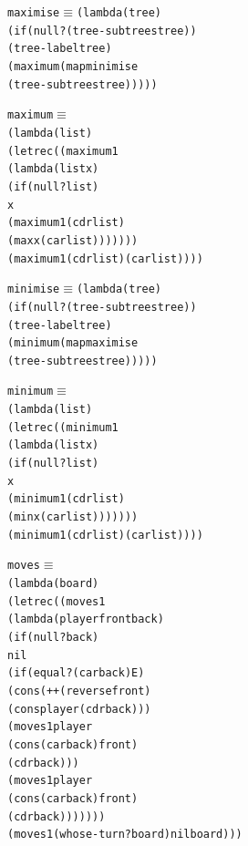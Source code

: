 \noindent\begin{minipage}{\linewidth}
\begin{alltt}
maximise \(\equiv\) (lambda (tree)
             (if (null? (tree-subtrees tree))
                 (tree-label tree)
                 (maximum (map minimise
                               (tree-subtrees tree)))))
\end{alltt}
\end{minipage}\par\bigskip

\noindent\begin{minipage}{\linewidth}
\begin{alltt}
maximum \(\equiv\)
  (lambda (list)
    (letrec ((maximum1
              (lambda (list x)
                (if (null? list)
                    x
                    (maximum1 (cdr list)
                              (max x (car list)))))))
      (maximum1 (cdr list) (car list))))
\end{alltt}
\end{minipage}\par\bigskip

\noindent\begin{minipage}{\linewidth}
\begin{alltt}
minimise \(\equiv\) (lambda (tree)
             (if (null? (tree-subtrees tree))
                 (tree-label tree)
                 (minimum (map maximise
                               (tree-subtrees tree)))))
\end{alltt}
\end{minipage}\par\bigskip

\noindent\begin{minipage}{\linewidth}
\begin{alltt}
minimum \(\equiv\)
  (lambda (list)
    (letrec ((minimum1
              (lambda (list x)
                (if (null? list)
                    x
                    (minimum1 (cdr list)
                              (min x (car list)))))))
      (minimum1 (cdr list) (car list))))
\end{alltt}
\end{minipage}\par\bigskip

\noindent\begin{minipage}{\linewidth}
\begin{alltt}
moves \(\equiv\)
  (lambda (board)
    (letrec ((moves1
              (lambda (player front back)
                (if (null? back)
                    nil
                    (if (equal? (car back) E)
                        (cons (++ (reverse front)
                                  (cons player (cdr back)))
                              (moves1 player
                                      (cons (car back) front)
                                      (cdr back)))
                        (moves1 player
                                (cons (car back) front)
                                (cdr back)))))))
      (moves1 (whose-turn? board) nil board)))
\end{alltt}
\end{minipage}\par\bigskip

